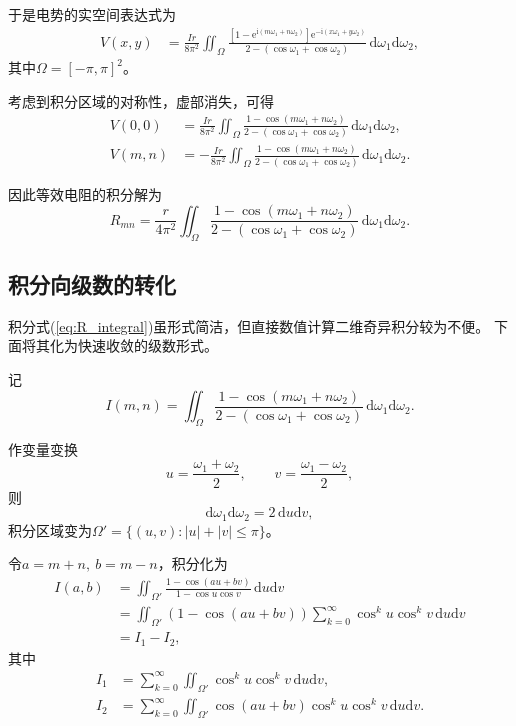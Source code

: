 \documentclass{article} %
\newcommand{\di}{\mathrm{d}}
\newcommand{\ii}{\mathrm{i}}
\newcommand{\e}[1]{\mathrm{e}^{#1}}
\begin{document}
于是电势的实空间表达式为
\begin{align}
  V(x,y)&=\frac{Ir}{8\pi^2}
  \iint_{\Omega}\frac{\left[1-\e{\ii(m\omega_1+n\omega_2)}\right]
  \e{-\ii(x\omega_1+y\omega_2)}}
  {2-(\cos\omega_1+\cos\omega_2)}\,\di\omega_1\di\omega_2,
\end{align}
其中$\Omega=[-\pi,\pi]^2$。

考虑到积分区域的对称性，虚部消失，可得
\begin{align}
  V(0,0)&=\frac{Ir}{8\pi^2}
  \iint_{\Omega}\frac{1-\cos(m\omega_1+n\omega_2)}
  {2-(\cos\omega_1+\cos\omega_2)}\,\di\omega_1\di\omega_2,\\
  V(m,n)&=-\frac{Ir}{8\pi^2}
  \iint_{\Omega}\frac{1-\cos(m\omega_1+n\omega_2)}
  {2-(\cos\omega_1+\cos\omega_2)}\,\di\omega_1\di\omega_2.
\end{align}

因此等效电阻的积分解为
\begin{equation}
  R_{mn}=\frac{r}{4\pi^2}
  \iint_{\Omega}\frac{1-\cos(m\omega_1+n\omega_2)}
  {2-(\cos\omega_1+\cos\omega_2)}\,\di\omega_1\di\omega_2.
\label{eq:R_integral}
\end{equation}

\subsection{积分向级数的转化}

积分式(\ref{eq:R_integral})虽形式简洁，但直接数值计算二维奇异积分较为不便。
下面将其化为快速收敛的级数形式。

记
\begin{equation}
  I(m,n)=\iint_{\Omega}\frac{1-\cos(m\omega_1+n\omega_2)}
  {2-(\cos\omega_1+\cos\omega_2)}\,\di\omega_1\di\omega_2.
\end{equation}

作变量变换
\begin{equation}
  u=\frac{\omega_1+\omega_2}{2},\qquad v=\frac{\omega_1-\omega_2}{2},
\end{equation}
则
\begin{equation}
  \di\omega_1\di\omega_2=2\,\di u\di v,
\end{equation}
积分区域变为$\Omega'=\{(u,v): |u|+|v|\leqslant \pi\}$。

令$a=m+n,\ b=m-n$，积分化为
\begin{align}
  I(a,b)&=\iint_{\Omega'}\frac{1-\cos(au+bv)}{1-\cos u\cos v}\,\di u\di v\nonumber\\
  &=\iint_{\Omega'}(1-\cos(au+bv))
  \sum_{k=0}^{\infty}\cos^k u\cos^k v\,\di u\di v\nonumber\\
  &=I_1-I_2,
\end{align}
其中
\begin{align}
  I_1&=\sum_{k=0}^{\infty}\iint_{\Omega'}\cos^k u\cos^k v\,\di u\di v,\\
  I_2&=\sum_{k=0}^{\infty}\iint_{\Omega'}\cos(au+bv)\cos^k u\cos^k v\,\di u\di v.
\end{align}
\end{document}

